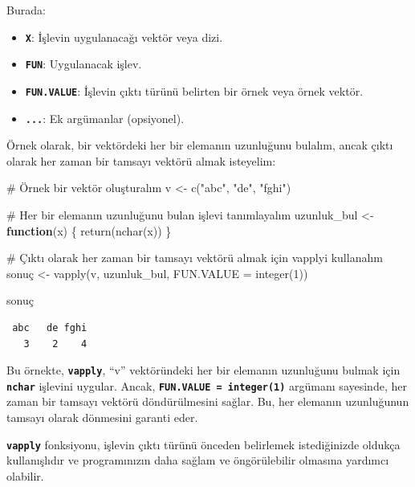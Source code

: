\documentclass[
  letterpaper,
  DIV=11,
  numbers=noendperiod]{scrreprt}
\newenvironment{Shaded}{\begin{snugshade}}{\end{snugshade}}
\newcommand{\AttributeTok}[1]{\textcolor[rgb]{0.40,0.45,0.13}{#1}}
\newcommand{\CommentTok}[1]{\textcolor[rgb]{0.37,0.37,0.37}{#1}}
\newcommand{\ControlFlowTok}[1]{\textcolor[rgb]{0.00,0.23,0.31}{\textbf{#1}}}
\newcommand{\DecValTok}[1]{\textcolor[rgb]{0.68,0.00,0.00}{#1}}
\newcommand{\FunctionTok}[1]{\textcolor[rgb]{0.28,0.35,0.67}{#1}}
\newcommand{\NormalTok}[1]{\textcolor[rgb]{0.00,0.23,0.31}{#1}}
\newcommand{\OtherTok}[1]{\textcolor[rgb]{0.00,0.23,0.31}{#1}}
\newcommand{\StringTok}[1]{\textcolor[rgb]{0.13,0.47,0.30}{#1}}
\begin{document}
Burada:

\begin{itemize}
\item
  \textbf{\texttt{X}}: İşlevin uygulanacağı vektör veya dizi.
\item
  \textbf{\texttt{FUN}}: Uygulanacak işlev.
\item
  \textbf{\texttt{FUN.VALUE}}: İşlevin çıktı türünü belirten bir örnek
  veya örnek vektör.
\item
  \textbf{\texttt{...}}: Ek argümanlar (opsiyonel).
\end{itemize}

Örnek olarak, bir vektördeki her bir elemanın uzunluğunu bulalım, ancak
çıktı olarak her zaman bir tamsayı vektörü almak isteyelim:

\begin{Shaded}
\begin{Highlighting}[]
\CommentTok{\# Örnek bir vektör oluşturalım}
\NormalTok{v }\OtherTok{\textless{}{-}} \FunctionTok{c}\NormalTok{(}\StringTok{"abc"}\NormalTok{, }\StringTok{"de"}\NormalTok{, }\StringTok{"fghi"}\NormalTok{)}

\CommentTok{\# Her bir elemanın uzunluğunu bulan işlevi tanımlayalım}
\NormalTok{uzunluk\_bul }\OtherTok{\textless{}{-}} \ControlFlowTok{function}\NormalTok{(x) \{}
  \FunctionTok{return}\NormalTok{(}\FunctionTok{nchar}\NormalTok{(x))}
\NormalTok{\}}

\CommentTok{\# Çıktı olarak her zaman bir tamsayı vektörü almak için vapply\textquotesingle{}i kullanalım}
\NormalTok{sonuç }\OtherTok{\textless{}{-}} \FunctionTok{vapply}\NormalTok{(v, uzunluk\_bul, }\AttributeTok{FUN.VALUE =} \FunctionTok{integer}\NormalTok{(}\DecValTok{1}\NormalTok{))}

\NormalTok{sonuç}
\end{Highlighting}
\end{Shaded}

\begin{verbatim}
 abc   de fghi 
   3    2    4 
\end{verbatim}

Bu örnekte, \textbf{\texttt{vapply}}, ``v'' vektöründeki her bir
elemanın uzunluğunu bulmak için \textbf{\texttt{nchar}} işlevini
uygular. Ancak, \textbf{\texttt{FUN.VALUE\ =\ integer(1)}} argümanı
sayesinde, her zaman bir tamsayı vektörü döndürülmesini sağlar. Bu, her
elemanın uzunluğunun tamsayı olarak dönmesini garanti eder.

\textbf{\texttt{vapply}} fonksiyonu, işlevin çıktı türünü önceden
belirlemek istediğinizde oldukça kullanışlıdır ve programınızın daha
sağlam ve öngörülebilir olmasına yardımcı olabilir.
\end{document}
